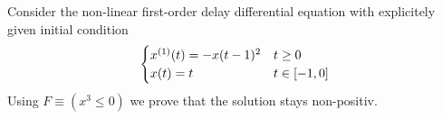\documentclass[10pt]{report}
\begin{document}
            Consider the non-linear first-order delay differential equation with explicitely given initial condition
            \begin{equation}
                \begin{cases}
                    \D{x}(t) = -x(t-1)^2 & t \geq 0\\
                    x(t) = t & t \in [-1,0]
                \end{cases}
            \end{equation}
            Using $F\equiv(x^3\leq 0)$ we prove that the solution stays non-positiv.
            \begin{small}
                \begin{sequentdeduction}
                \end{sequentdeduction}
            \end{small}
\end{document}
